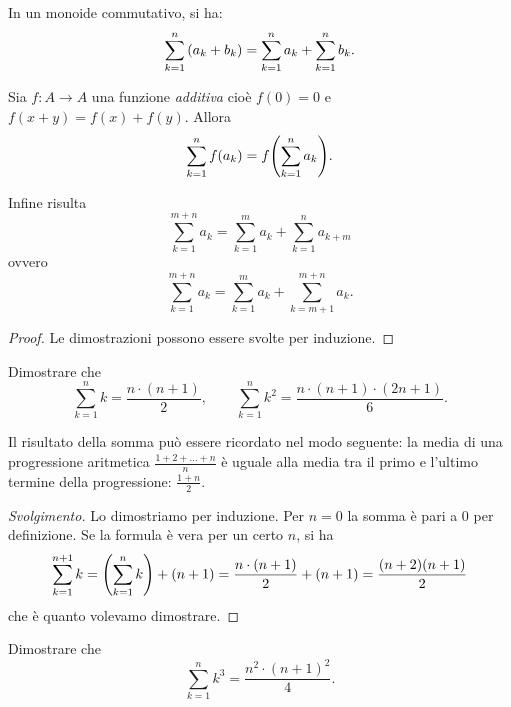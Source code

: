 \begin{theorem}
In un monoide commutativo, si ha:
  \[
  \sum_{k=1}^n  {\left( a_k + b_k \right)} 
  = \sum_{k=1}^n a_k + \sum_{k=1}^n b_k.
  \]

Sia $f\colon A\to A$ una funzione \emph{additiva}
cioè $f(0) = 0$ e $f(x+y)=f(x)+f(y)$.
Allora 
  \[
    \sum_{k=1}^n  f(a_k) = f{\left( \sum_{k=1}^n a_k \right)}.
  \]

Infine risulta 
  \[
  \sum_{k=1}^{m+n} a_k = \sum_{k=1}^m a_k + \sum_{k=1}^n a_{k+m}
  \]
ovvero 
  \[
  \sum_{k=1}^{m+n} a_k = \sum_{k=1}^m a_k + \sum_{k=m+1}^{m+n} a_k.  
  \]
\end{theorem}
\begin{proof}
  Le dimostrazioni possono essere svolte 
  per induzione.
\end{proof}

\begin{exercise}
  \label{ex:somma_lineare}%
  Dimostrare che 
  \[
    \sum_{k=1}^n k = \frac{n\cdot (n+1)}{2}, \qquad
    \sum_{k=1}^n k^2 = \frac{n\cdot (n+1)\cdot (2n+1)}{6}.
  \]
\end{exercise}
Il risultato della somma può essere ricordato nel modo seguente:
la media di una progressione aritmetica $\frac{1+2+ \dots + n}{n}$ 
è uguale alla media tra il primo 
e l'ultimo termine della progressione: $\frac{1+n}{2}$.
\begin{proof}[Svolgimento]
Lo dimostriamo per induzione.
Per $n=0$ la somma è pari a $0$ per definizione.
Se la formula è vera per un certo $n$, si ha 
\[
  \sum_{k=1}^{n+1} k = {\left( \sum_{k=1}^n k \right)} + (n+1)
   = \frac{n\cdot(n+1)}{2} + (n+1) 
   = \frac{(n+2)(n+1)}{2}
\]
che è quanto volevamo dimostrare.
\end{proof}

\begin{exercise}
Dimostrare che 
\[
  \sum_{k=1}^n k^3 = \frac{n^2\cdot (n+1)^2}{4}.
\]
\end{exercise}

